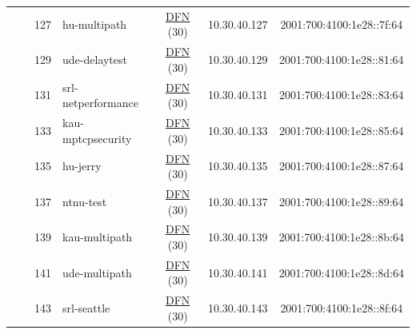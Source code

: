 \begin{small}
\begin{center}
\begin{longtable}{|c|c|c|c|c|c|c|c|}
  &  & \tiny{127} & \multicolumn{1}{|l|}{\tiny{hu-multipath}} & \multicolumn{2}{|c|}{\tiny{\href{https://www.dfn.de}{DFN} (30)}} & \tiny{10.30.40.127} & \tiny{2001:700:4100:1e28::7f:64} \\* \cline{3-3}\cline{4-4}\cline{5-5}\cline{6-6}\cline{7-7}\cline{8-8}
  &  & \tiny{129} & \multicolumn{1}{|l|}{\tiny{ude-delaytest}} & \multicolumn{2}{|c|}{\tiny{\href{https://www.dfn.de}{DFN} (30)}} & \tiny{10.30.40.129} & \tiny{2001:700:4100:1e28::81:64} \\* \cline{3-3}\cline{4-4}\cline{5-5}\cline{6-6}\cline{7-7}\cline{8-8}
  &  & \tiny{131} & \multicolumn{1}{|l|}{\tiny{srl-netperformance}} & \multicolumn{2}{|c|}{\tiny{\href{https://www.dfn.de}{DFN} (30)}} & \tiny{10.30.40.131} & \tiny{2001:700:4100:1e28::83:64} \\* \cline{3-3}\cline{4-4}\cline{5-5}\cline{6-6}\cline{7-7}\cline{8-8}
  &  & \tiny{133} & \multicolumn{1}{|l|}{\tiny{kau-mptcpsecurity}} & \multicolumn{2}{|c|}{\tiny{\href{https://www.dfn.de}{DFN} (30)}} & \tiny{10.30.40.133} & \tiny{2001:700:4100:1e28::85:64} \\* \cline{3-3}\cline{4-4}\cline{5-5}\cline{6-6}\cline{7-7}\cline{8-8}
  &  & \tiny{135} & \multicolumn{1}{|l|}{\tiny{hu-jerry}} & \multicolumn{2}{|c|}{\tiny{\href{https://www.dfn.de}{DFN} (30)}} & \tiny{10.30.40.135} & \tiny{2001:700:4100:1e28::87:64} \\* \cline{3-3}\cline{4-4}\cline{5-5}\cline{6-6}\cline{7-7}\cline{8-8}
  &  & \tiny{137} & \multicolumn{1}{|l|}{\tiny{ntnu-test}} & \multicolumn{2}{|c|}{\tiny{\href{https://www.dfn.de}{DFN} (30)}} & \tiny{10.30.40.137} & \tiny{2001:700:4100:1e28::89:64} \\* \cline{3-3}\cline{4-4}\cline{5-5}\cline{6-6}\cline{7-7}\cline{8-8}
  &  & \tiny{139} & \multicolumn{1}{|l|}{\tiny{kau-multipath}} & \multicolumn{2}{|c|}{\tiny{\href{https://www.dfn.de}{DFN} (30)}} & \tiny{10.30.40.139} & \tiny{2001:700:4100:1e28::8b:64} \\* \cline{3-3}\cline{4-4}\cline{5-5}\cline{6-6}\cline{7-7}\cline{8-8}
  &  & \tiny{141} & \multicolumn{1}{|l|}{\tiny{ude-multipath}} & \multicolumn{2}{|c|}{\tiny{\href{https://www.dfn.de}{DFN} (30)}} & \tiny{10.30.40.141} & \tiny{2001:700:4100:1e28::8d:64} \\* \cline{3-3}\cline{4-4}\cline{5-5}\cline{6-6}\cline{7-7}\cline{8-8}
  &  & \tiny{143} & \multicolumn{1}{|l|}{\tiny{srl-seattle}} & \multicolumn{2}{|c|}{\tiny{\href{https://www.dfn.de}{DFN} (30)}} & \tiny{10.30.40.143} & \tiny{2001:700:4100:1e28::8f:64} \\* \cline{3-3}\cline{4-4}\cline{5-5}\cline{6-6}\cline{7-7}\cline{8-8}

\end{longtable}
\end{center}
\end{small}
